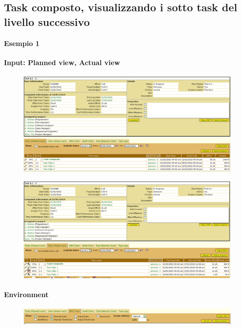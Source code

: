 \subsection{Task composto, visualizzando i sotto task del livello successivo}
\paragraph{Esempio 1}
\paragraph{Input: Planned view, Actual view}
\begin{figure}[h!]
\centering
\includegraphics[width=\textwidth]{tests/TEST_WBS/4.1/4.1_2/Esempio_1/input.png}
\end{figure}
\begin{figure}[h!]
\centering
\includegraphics[width=\textwidth]{tests/TEST_WBS/4.1/4.1_2/Esempio_1/input_actual.png}
\end{figure}
\newpage

\paragraph{Environment}
\begin{figure}[h!]
\centering
\includegraphics[width=\textwidth]{tests/TEST_WBS/4.1/4.1_2/Esempio_1/environment.png}
\end{figure}

